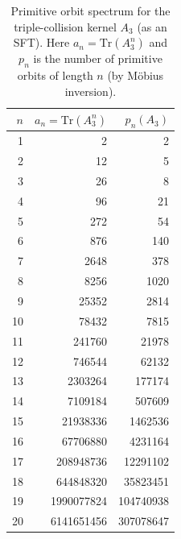 \begin{table}[H]
\centering
\scriptsize
\setlength{\tabcolsep}{6pt}
\caption{Primitive orbit spectrum for the triple-collision kernel $A_3$ (as an SFT). Here $a_n=\mathrm{Tr}(A_3^n)$ and $p_n$ is the number of primitive orbits of length $n$ (by M\"obius inversion).}
\label{tab:collision_kernel_A3_primitive}
\begin{tabular}{r r r}
\toprule
$n$ & $a_n=\mathrm{Tr}(A_3^n)$ & $p_n(A_3)$\\
\midrule
1 & 2 & 2\\
2 & 12 & 5\\
3 & 26 & 8\\
4 & 96 & 21\\
5 & 272 & 54\\
6 & 876 & 140\\
7 & 2648 & 378\\
8 & 8256 & 1020\\
9 & 25352 & 2814\\
10 & 78432 & 7815\\
11 & 241760 & 21978\\
12 & 746544 & 62132\\
13 & 2303264 & 177174\\
14 & 7109184 & 507609\\
15 & 21938336 & 1462536\\
16 & 67706880 & 4231164\\
17 & 208948736 & 12291102\\
18 & 644848320 & 35823451\\
19 & 1990077824 & 104740938\\
20 & 6141651456 & 307078647\\
\bottomrule
\end{tabular}
\end{table}
